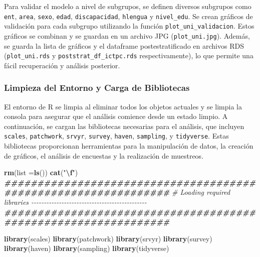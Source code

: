 \documentclass[
  12pt,
]{book}
\newenvironment{Shaded}{\begin{snugshade}}{\end{snugshade}}
\newcommand{\AttributeTok}[1]{\textcolor[rgb]{0.13,0.29,0.53}{#1}}
\newcommand{\CommentTok}[1]{\textcolor[rgb]{0.56,0.35,0.01}{\textit{#1}}}
\newcommand{\DocumentationTok}[1]{\textcolor[rgb]{0.56,0.35,0.01}{\textbf{\textit{#1}}}}
\newcommand{\FunctionTok}[1]{\textcolor[rgb]{0.13,0.29,0.53}{\textbf{#1}}}
\newcommand{\NormalTok}[1]{#1}
\newcommand{\SpecialCharTok}[1]{\textcolor[rgb]{0.81,0.36,0.00}{\textbf{#1}}}
\newcommand{\StringTok}[1]{\textcolor[rgb]{0.31,0.60,0.02}{#1}}
\begin{document}
Para validar el modelo a nivel de subgrupos, se definen diversos subgrupos como \texttt{ent}, \texttt{area}, \texttt{sexo}, \texttt{edad}, \texttt{discapacidad}, \texttt{hlengua} y \texttt{nivel\_edu}. Se crean gráficos de validación para cada subgrupo utilizando la función \texttt{plot\_uni\_validacion}. Estos gráficos se combinan y se guardan en un archivo JPG (\texttt{plot\_uni.jpg}). Además, se guarda la lista de gráficos y el dataframe postestratificado en archivos RDS (\texttt{plot\_uni.rds} y \texttt{poststrat\_df\_ictpc.rds} respectivamente), lo que permite una fácil recuperación y análisis posterior.

\hypertarget{limpieza-del-entorno-y-carga-de-bibliotecas-6}{%
\subsubsection*{Limpieza del Entorno y Carga de Bibliotecas}\label{limpieza-del-entorno-y-carga-de-bibliotecas-6}}

El entorno de R se limpia al eliminar todos los objetos actuales y se limpia la consola para asegurar que el análisis comience desde un estado limpio. A continuación, se cargan las bibliotecas necesarias para el análisis, que incluyen \texttt{scales}, \texttt{patchwork}, \texttt{srvyr}, \texttt{survey}, \texttt{haven}, \texttt{sampling}, y \texttt{tidyverse}. Estas bibliotecas proporcionan herramientas para la manipulación de datos, la creación de gráficos, el análisis de encuestas y la realización de muestreos.

\begin{Shaded}
\begin{Highlighting}[]
\FunctionTok{rm}\NormalTok{(}\AttributeTok{list =}\FunctionTok{ls}\NormalTok{())}
\FunctionTok{cat}\NormalTok{(}\StringTok{"}\SpecialCharTok{\textbackslash{}f}\StringTok{"}\NormalTok{)}
\DocumentationTok{\#\#\#\#\#\#\#\#\#\#\#\#\#\#\#\#\#\#\#\#\#\#\#\#\#\#\#\#\#\#\#\#\#\#\#\#\#\#\#\#\#\#\#\#\#\#\#\#\#\#\#\#\#\#\#\#\#\#\#\#\#\#\#}
\CommentTok{\# Loading required libraries {-}{-}{-}{-}{-}{-}{-}{-}{-}{-}{-}{-}{-}{-}{-}{-}{-}{-}{-}{-}{-}{-}{-}{-}{-}{-}{-}{-}{-}{-}{-}{-}{-}{-}{-}{-}{-}{-}{-}{-}{-}{-}{-}{-}{-}{-}}
\DocumentationTok{\#\#\#\#\#\#\#\#\#\#\#\#\#\#\#\#\#\#\#\#\#\#\#\#\#\#\#\#\#\#\#\#\#\#\#\#\#\#\#\#\#\#\#\#\#\#\#\#\#\#\#\#\#\#\#\#\#\#\#\#\#\#\#}

\FunctionTok{library}\NormalTok{(scales)}
\FunctionTok{library}\NormalTok{(patchwork)}
\FunctionTok{library}\NormalTok{(srvyr)}
\FunctionTok{library}\NormalTok{(survey)}
\FunctionTok{library}\NormalTok{(haven)}
\FunctionTok{library}\NormalTok{(sampling)}
\FunctionTok{library}\NormalTok{(tidyverse)}
\end{Highlighting}
\end{Shaded}
\end{document}

